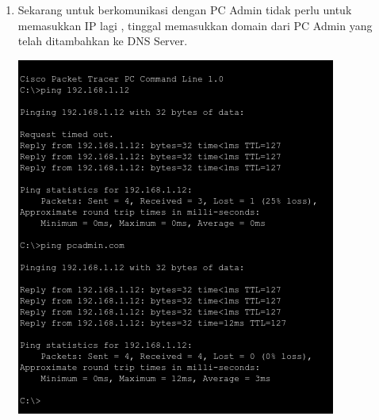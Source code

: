 \documentclass{article}
\begin{document}
\begin{flushleft}
\begin{enumerate}
            \item Sekarang untuk berkomunikasi dengan PC Admin tidak perlu untuk memasukkan IP lagi , tinggal memasukkan domain dari PC Admin yang telah ditambahkan ke DNS Server.
            \begin{center}
                \includegraphics[scale=0.5]{3-14.png}
            \end{center}
        \end{enumerate}
    \end{flushleft}
\end{document}
